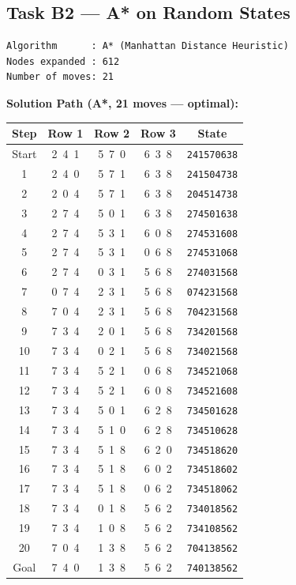 \documentclass[12pt, a4paper]{article}
\begin{document}
\subsection{Task B2 --- A* on Random States}

\begin{lstlisting}[style=mono]
Algorithm      : A* (Manhattan Distance Heuristic)
Nodes expanded : 612
Number of moves: 21
\end{lstlisting}

\textbf{Solution Path (A*, 21 moves --- optimal):}

\begin{center}
\small
\begin{tabular}{ccccc}
\toprule
\textbf{Step} & \textbf{Row 1} & \textbf{Row 2} & \textbf{Row 3} & \textbf{State} \\
\midrule
\rowcolor{lightblue}
Start & 2\ 4\ 1 & 5\ 7\ 0 & 6\ 3\ 8 & \texttt{241570638} \\
1  & 2\ 4\ 0 & 5\ 7\ 1 & 6\ 3\ 8 & \texttt{241504738} \\
2  & 2\ 0\ 4 & 5\ 7\ 1 & 6\ 3\ 8 & \texttt{204514738} \\
3  & 2\ 7\ 4 & 5\ 0\ 1 & 6\ 3\ 8 & \texttt{274501638} \\
4  & 2\ 7\ 4 & 5\ 3\ 1 & 6\ 0\ 8 & \texttt{274531608} \\
5  & 2\ 7\ 4 & 5\ 3\ 1 & 0\ 6\ 8 & \texttt{274531068} \\
6  & 2\ 7\ 4 & 0\ 3\ 1 & 5\ 6\ 8 & \texttt{274031568} \\
7  & 0\ 7\ 4 & 2\ 3\ 1 & 5\ 6\ 8 & \texttt{074231568} \\
8  & 7\ 0\ 4 & 2\ 3\ 1 & 5\ 6\ 8 & \texttt{704231568} \\
9  & 7\ 3\ 4 & 2\ 0\ 1 & 5\ 6\ 8 & \texttt{734201568} \\
10 & 7\ 3\ 4 & 0\ 2\ 1 & 5\ 6\ 8 & \texttt{734021568} \\
11 & 7\ 3\ 4 & 5\ 2\ 1 & 0\ 6\ 8 & \texttt{734521068} \\
12 & 7\ 3\ 4 & 5\ 2\ 1 & 6\ 0\ 8 & \texttt{734521608} \\
13 & 7\ 3\ 4 & 5\ 0\ 1 & 6\ 2\ 8 & \texttt{734501628} \\
14 & 7\ 3\ 4 & 5\ 1\ 0 & 6\ 2\ 8 & \texttt{734510628} \\
15 & 7\ 3\ 4 & 5\ 1\ 8 & 6\ 2\ 0 & \texttt{734518620} \\
16 & 7\ 3\ 4 & 5\ 1\ 8 & 6\ 0\ 2 & \texttt{734518602} \\
17 & 7\ 3\ 4 & 5\ 1\ 8 & 0\ 6\ 2 & \texttt{734518062} \\
18 & 7\ 3\ 4 & 0\ 1\ 8 & 5\ 6\ 2 & \texttt{734018562} \\
19 & 7\ 3\ 4 & 1\ 0\ 8 & 5\ 6\ 2 & \texttt{734108562} \\
20 & 7\ 0\ 4 & 1\ 3\ 8 & 5\ 6\ 2 & \texttt{704138562} \\
\rowcolor{lightblue}
Goal & 7\ 4\ 0 & 1\ 3\ 8 & 5\ 6\ 2 & \texttt{740138562} \\
\bottomrule
\end{tabular}
\end{center}
\end{document}
